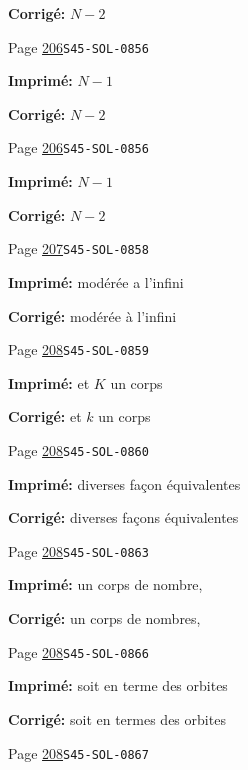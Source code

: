 \begin{description}
\par\noindent\textbf{Corrigé:} \(N-2\)
\smallskip
\item[\hypertarget{apparatus:FR-0202}{202}] Page \hyperlink{printpage:fr:206}{206}\quad\texttt{S45-SOL-0856}
\par\noindent\textbf{Imprimé:} \(N-1\)
\par\noindent\textbf{Corrigé:} \(N-2\)
\smallskip
\item[\hypertarget{apparatus:FR-0203}{203}] Page \hyperlink{printpage:fr:206}{206}\quad\texttt{S45-SOL-0856}
\par\noindent\textbf{Imprimé:} \(N-1\)
\par\noindent\textbf{Corrigé:} \(N-2\)
\smallskip
\item[\hypertarget{apparatus:FR-0204}{204}] Page \hyperlink{printpage:fr:207}{207}\quad\texttt{S45-SOL-0858}
\par\noindent\textbf{Imprimé:} modérée a l'infini
\par\noindent\textbf{Corrigé:} modérée à l'infini
\smallskip
\item[\hypertarget{apparatus:FR-0205}{205}] Page \hyperlink{printpage:fr:208}{208}\quad\texttt{S45-SOL-0859}
\par\noindent\textbf{Imprimé:} et $K$ un corps
\par\noindent\textbf{Corrigé:} et $k$ un corps
\smallskip
\item[\hypertarget{apparatus:FR-0206}{206}] Page \hyperlink{printpage:fr:208}{208}\quad\texttt{S45-SOL-0860}
\par\noindent\textbf{Imprimé:} diverses façon équivalentes
\par\noindent\textbf{Corrigé:} diverses façons équivalentes
\smallskip
\item[\hypertarget{apparatus:FR-0207}{207}] Page \hyperlink{printpage:fr:208}{208}\quad\texttt{S45-SOL-0863}
\par\noindent\textbf{Imprimé:} un corps de nombre,
\par\noindent\textbf{Corrigé:} un corps de nombres,
\smallskip
\item[\hypertarget{apparatus:FR-0208}{208}] Page \hyperlink{printpage:fr:208}{208}\quad\texttt{S45-SOL-0866}
\par\noindent\textbf{Imprimé:} soit en terme des orbites
\par\noindent\textbf{Corrigé:} soit en termes des orbites
\smallskip
\item[\hypertarget{apparatus:FR-0209}{209}] Page \hyperlink{printpage:fr:208}{208}\quad\texttt{S45-SOL-0867}

\end{description}
